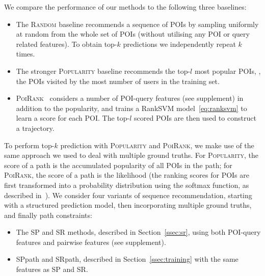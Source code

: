 We compare the performance of our methods to the following three baselines:
\begin{itemize}[leftmargin=0.125in]\itemmoveup
\parskip -.05em
\item The \textsc{Random} baseline recommends a sequence of POIs by sampling uniformly at random from the whole set of POIs
      (without utilising any POI or query related features). To obtain top-$k$ predictions
			we independently repeat $k$ times.

\item The stronger \textsc{Popularity} baseline recommends the top-$l$ most popular POIs,
      \ie, the POIs visited by the most number of users in the training set.

\item \textsc{PoiRank}~\cite{cikm16paper}
      considers a number of POI-query features (see supplement) in addition to the popularity,
      and trains a RankSVM model~\eqref{eq:ranksvm} to learn a score for each POI. The top-$l$ scored POIs are then used to construct a trajectory.
\end{itemize}\itemmoveup
To perform top-$k$ prediction with \textsc{Popularity} and \textsc{PoiRank},
we make use of the same approach we used to deal with multiple ground truths.
For \textsc{Popularity}, the score of a path is the accumulated popularity of all POIs in the path;
for \textsc{PoiRank}, the score of a path is the likelihood
(the ranking scores for POIs are first transformed into a probability distribution using the softmax function, as described in~\cite{cikm16paper}).
We consider four variants of sequence recommendation, starting with a structured prediction model, then incorporating multiple ground truths, and finally path constraints:
\begin{itemize}[leftmargin=0.125in]
\item The SP and SR methods, described in Section~\ref{ssec:sr}, using both POI-query features and pairwise features (see supplement).

\item {\sc SPpath} and {\sc SRpath}, described in Section~\ref{ssec:training} with the same features as SP and SR.
\end{itemize}\itemmoveup
